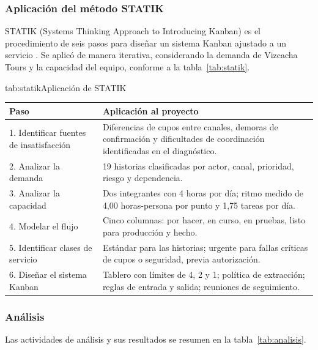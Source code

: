 \subsubsection{Aplicación del método STATIK}

STATIK (Systems Thinking Approach to Introducing Kanban) es el procedimiento
de seis pasos para diseñar un sistema Kanban ajustado a un servicio
\parencite{kanbanGuia}. Se aplicó de manera iterativa, considerando la
demanda de Vizcacha Tours y la capacidad del equipo, conforme a la
tabla~\ref{tab:statik}.

\begin{tablaapa}{tab:statik}{Aplicación de STATIK}
\small
\begin{tabular}{@{}p{4.2cm}p{10cm}@{}}
\toprule
Paso & Aplicación al proyecto \\
\midrule
1. Identificar fuentes de insatisfacción & Diferencias de cupos entre
canales, demoras de confirmación y dificultades de coordinación
identificadas en el diagnóstico. \\
2. Analizar la demanda & 19 historias clasificadas por actor, canal,
prioridad, riesgo y dependencia. \\
3. Analizar la capacidad & Dos integrantes con 4 horas por día; ritmo medido
de 4,00 horas-persona por punto y 1,75 tareas por día. \\
4. Modelar el flujo & Cinco columnas: por hacer, en curso, en pruebas,
listo para producción y hecho. \\
5. Identificar clases de servicio & Estándar para las historias; urgente
para fallas críticas de cupos o seguridad, previa autorización. \\
6. Diseñar el sistema Kanban & Tablero con límites de 4, 2 y 1; política de
extracción; reglas de entrada y salida; reuniones de seguimiento. \\
\bottomrule
\end{tabular}
\end{tablaapa}

\subsubsection{Análisis} Las actividades de análisis y sus resultados se
resumen en la tabla~\ref{tab:analisis}.

